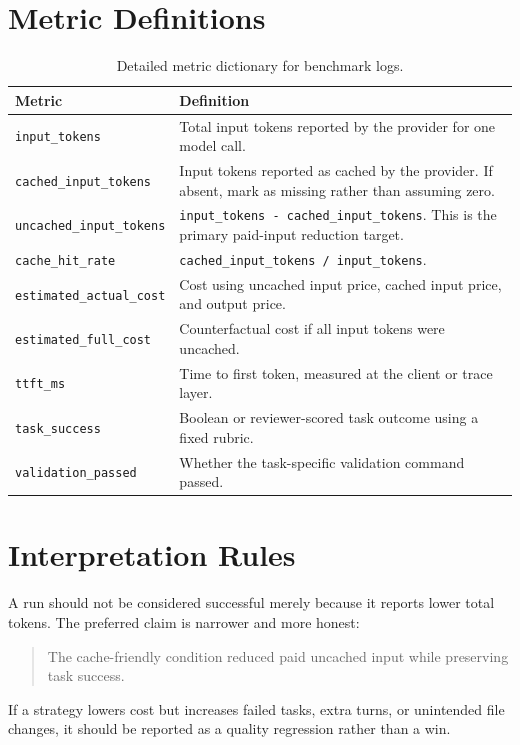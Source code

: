 \section{Metric Definitions}
\label{app:metrics}

\begin{table}[h]
\centering
\caption{Detailed metric dictionary for benchmark logs.}
\label{tab:metric-dictionary}
\small
\begin{tabularx}{\linewidth}{@{}lX@{}}
\toprule
\textbf{Metric} & \textbf{Definition} \\
\midrule
\texttt{input\_tokens} & Total input tokens reported by the provider for one model call. \\
\texttt{cached\_input\_tokens} & Input tokens reported as cached by the provider. If absent, mark as missing rather than assuming zero. \\
\texttt{uncached\_input\_tokens} & \texttt{input\_tokens - cached\_input\_tokens}. This is the primary paid-input reduction target. \\
\texttt{cache\_hit\_rate} & \texttt{cached\_input\_tokens / input\_tokens}. \\
\texttt{estimated\_actual\_cost} & Cost using uncached input price, cached input price, and output price. \\
\texttt{estimated\_full\_cost} & Counterfactual cost if all input tokens were uncached. \\
\texttt{ttft\_ms} & Time to first token, measured at the client or trace layer. \\
\texttt{task\_success} & Boolean or reviewer-scored task outcome using a fixed rubric. \\
\texttt{validation\_passed} & Whether the task-specific validation command passed. \\
\bottomrule
\end{tabularx}
\end{table}

\section{Interpretation Rules}
\label{app:interpretation}

A run should not be considered successful merely because it reports lower total tokens. The preferred claim is narrower and more honest:
\begin{quote}
The cache-friendly condition reduced paid uncached input while preserving task success.
\end{quote}
If a strategy lowers cost but increases failed tasks, extra turns, or unintended file changes, it should be reported as a quality regression rather than a win.

